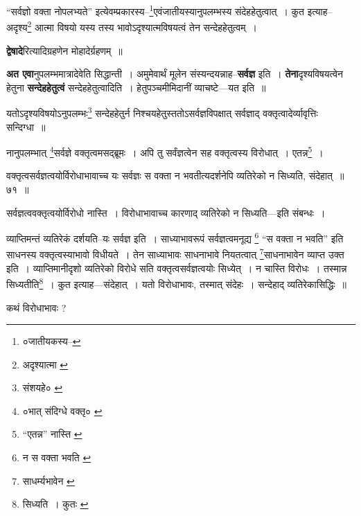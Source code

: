 \documentclass[article,12pt,a4paper]{memoir}
\begin{document}
	  \pstart “सर्वज्ञो वक्ता नोपलभ्यते” इत्येवम्प्रकारस्य--\footnote{०जातीयकस्य--\cite{dp-msB}}एवंजातीयस्यानुपलम्भस्य संदेहहेतुत्वात् । कुत इत्याह--अदृश्य\footnote{अदृश्यात्मा \cite{dp-msA} \cite{dp-msB} \cite{dp-edP} \cite{dp-edH} \cite{dp-edE} \cite{dp-edN}} आत्मा विषयो यस्य तस्य भावोऽदृश्यात्मविषयत्वं तेन सन्देहहेतुत्वम् ।
	\pend
      
	  \endgroup
	

	  \pstart \textbf{द्वेषादे}रित्यादिग्रहणेन मोहादेर्ग्रहणम् ॥
	\pend
      

	  \pstart \textbf{अत एवा}नुपलम्भमात्रादेवेति सिद्धान्ती । अमुमेवार्थं मूलेन संस्यन्दयन्नाह--\textbf{सर्वज्ञ} इति । \textbf{तेना}दृश्यविषयत्वेन हेतुना \textbf{सन्देहहेतुत्वं} सन्देहहेतुत्वादिति । हेतुपञ्चमीमिदानीं व्याचष्टे—यत इति ॥
	\pend
      \leavevmode{}
	  \bigskip
	  \begingroup
	

	  \pstart यतोऽदृश्यविषयोऽनुपलम्भः\footnote{संशयहे० \cite{dp-msA} \cite{dp-edP} \cite{dp-edH} \cite{dp-edE} \cite{dp-edN}} सन्देहहेतुर्न निश्चयहेतुस्ततोऽसर्वज्ञविपक्षात् सर्वज्ञाद् वक्तृत्वादेर्व्यावृत्तिः सन्दिग्धा ॥
	\pend
       

	  \pstart नानुपलम्भात् \footnote{०भात् संदिग्धे वक्तृ० \cite{dp-msB}}सर्वज्ञे वक्तृत्वमसद्ब्रूमः । अपि तु सर्वंज्ञत्वेन सह वक्तृत्वस्य विरोधात् । एतन्न\footnote{“एतन्न” नास्ति \cite{dp-edE}} ।
	\pend
       
	  \bigskip
	  \begingroup
	

	  \pstart वक्तृत्वसर्वज्ञत्वयोर्विरोधाभावाच्च यः सर्वज्ञः स वक्ता न भवतीत्यदर्शनेपि व्यतिरेको न सिध्यति, संदेहात् ॥ ७१ ॥
	\pend
      
	  \endgroup
	 

	  \pstart सर्वज्ञत्ववक्तृत्वयोर्विरोधो नास्ति । विरोधाभावाच्च कारणाद् व्यतिरेको न सिध्यति—इति संबन्धः ।
	\pend
       

	  \pstart व्याप्तिमन्तं व्यतिरेकं दर्शयति--यः सर्वज्ञ इति । साध्याभावरूपं सर्वज्ञत्वमनूद्य \footnote{न स वक्ता भवति \cite{dp-msA} \cite{dp-edP} \cite{dp-edH} \cite{dp-edE} \cite{dp-edN}} “स वक्ता न भवति” इति साधनस्य वक्तृत्वस्याभावो विधीयते । तेन साध्याभावः साधनाभावे नियतत्वात् \footnote{साधर्म्यभावेन \cite{dp-msB}}साधनाभावेन व्याप्त उक्त इति । व्याप्तिमानीदृशो व्यतिरेको विरोधे सति वक्तृत्वसर्वज्ञत्वयोः सिध्येत् । न चास्ति विरोधः । तस्मान्न सिध्यतीति\footnote{सिध्यति । कुतः \cite{dp-msA} \cite{dp-edP} \cite{dp-edH} \cite{dp-edE} \cite{dp-edN}} । कुत इत्याह—संदेहात् । यतो विरोधाभावः, तस्मात् संदेहः । सन्देहाद् व्यतिरेकासिद्धिः ॥
	\pend
       

	  \pstart कथं विरोधाभावः ?
	\pend
       
\end{document}
